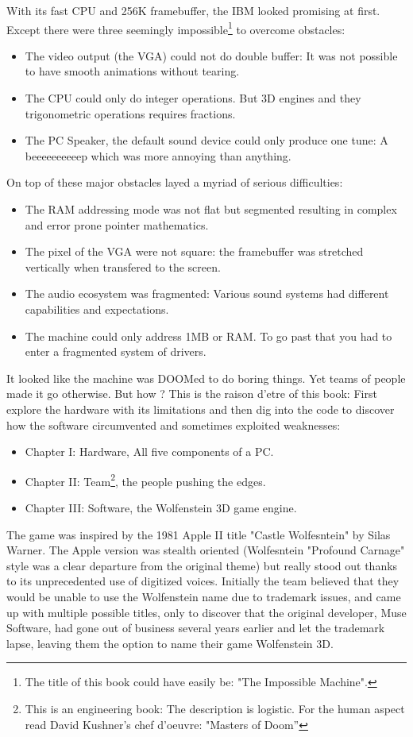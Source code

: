 With its fast CPU and 256K framebuffer, the IBM looked promising at first. Except there were three seemingly impossible\footnote{The title of this book could have easily be: "The Impossible Machine".} to overcome obstacles:\\
\begin{itemize}
\item The video output (the VGA) could not do double buffer: It was not possible to have smooth animations without tearing.
\item The CPU could only do integer operations. But 3D engines and they trigonometric operations requires fractions.
\item The PC Speaker, the default sound device could only produce one tune: A beeeeeeeeeep which was more annoying than anything.
\end{itemize}
On top of these major obstacles layed a myriad of serious difficulties:\\
\begin{itemize}
\item The RAM addressing mode was not flat but segmented resulting in complex and error prone pointer mathematics.
\item The pixel of the VGA were not square: the framebuffer was stretched vertically when transfered to the screen.
\item The audio ecosystem was fragmented: Various sound systems had different capabilities and expectations.
\item The machine could only address 1MB or RAM. To go past that you had to enter a fragmented system of drivers.
\end{itemize}

It looked like the machine was DOOMed to do boring things. Yet teams of people made it go otherwise. But how ? This is the raison d'etre of this book: First explore the hardware with its limitations and then dig into the code to discover how the software circumvented and sometimes exploited weaknesses:
\begin{itemize}
\item Chapter I: Hardware, All five components of a PC.
\item Chapter II: Team\footnote{This is an engineering book: The description is logistic. For the human aspect read David Kushner's chef d'oeuvre: "Masters of Doom''}, the people pushing the edges.
\item Chapter III: Software, the Wolfenstein 3D game engine.
\end{itemize}
\par
{} The game was inspired by the 1981 Apple II title "Castle Wolfesntein" by Silas Warner. The Apple version was stealth oriented (Wolfesntein "Profound Carnage" style was a clear departure from the original theme) but really stood out thanks to its unprecedented use of digitized voices. Initially the team believed that they would be unable to use the Wolfenstein name due to trademark issues, and came up with multiple possible titles, only to discover that the original developer, Muse Software, had gone out of business several years earlier and let the trademark lapse, leaving them the option to name their game Wolfenstein 3D.

